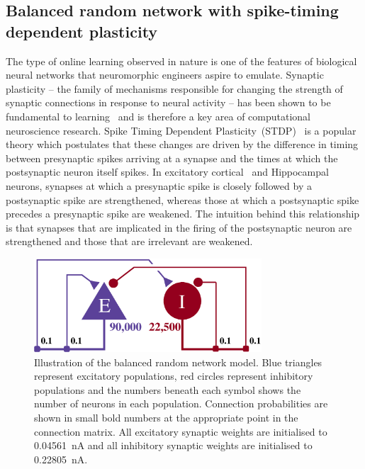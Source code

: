 \documentclass[utf8]{frontiersSCNS} %
\begin{document}
\subsection{Balanced random network with spike-timing dependent plasticity}
\label{sec:method/balanced_random}
The type of  online learning observed in nature is one of the features of biological neural networks that neuromorphic engineers aspire to emulate.
Synaptic plasticity -- the family of mechanisms responsible for changing the strength of synaptic connections in response to neural activity -- has been shown to be fundamental to learning~\citep{Nabavi2014} and is therefore a key area of computational neuroscience research.
Spike Timing Dependent Plasticity~(STDP)~\citep{Markram1997,Bi1998} is a popular theory which postulates that these changes are driven by the difference in timing between presynaptic spikes arriving at a synapse and the times at which the postsynaptic neuron itself spikes.
In excitatory cortical~\citep{Markram1997} and Hippocampal~\citep{Bi1998} neurons, synapses at which a presynaptic spike is closely followed by a postsynaptic spike are strengthened, whereas those at which a postsynaptic spike precedes a presynaptic spike are weakened.
The intuition behind this relationship is that synapses that are implicated in the firing of the postsynaptic neuron are strengthened and those that are irrelevant are weakened.

\begin{figure}
    \begin{center}
        \includegraphics[width=85mm]{figures/circuit2}
    \end{center}
    \caption{Illustration of the balanced random network model.
    Blue triangles represent excitatory populations, red circles represent inhibitory populations and the numbers beneath each symbol shows the number of neurons in each population.
    Connection probabilities are shown in small bold numbers at the appropriate point in the connection matrix.
    All excitatory synaptic weights are initialised to \SI{0.04561}{\nano\ampere} and all inhibitory synaptic weights are initialised to \SI{0.22805}{\nano\ampere}.}
    \label{fig:balanced_random_circuit}
\end{figure}
\end{document}
